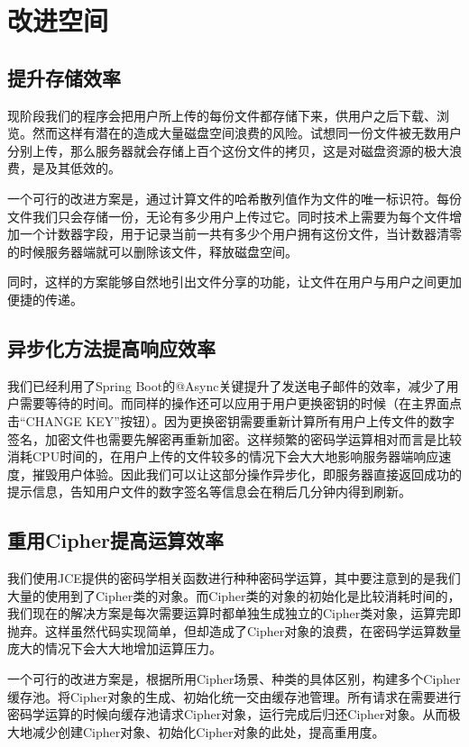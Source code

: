 
\chapter{改进空间}

\section{提升存储效率}

现阶段我们的程序会把用户所上传的每份文件都存储下来，供用户之后下载、浏览。然而这样有潜在的造成大量磁盘空间浪费的风险。试想同一份文件被无数用户分别上传，那么服务器就会存储上百个这份文件的拷贝，这是对磁盘资源的极大浪费，是及其低效的。

一个可行的改进方案是，通过计算文件的哈希散列值作为文件的唯一标识符。每份文件我们只会存储一份，无论有多少用户上传过它。同时技术上需要为每个文件增加一个计数器字段，用于记录当前一共有多少个用户拥有这份文件，当计数器清零的时候服务器端就可以删除该文件，释放磁盘空间。

同时，这样的方案能够自然地引出文件分享的功能，让文件在用户与用户之间更加便捷的传递。

\section{异步化方法提高响应效率}

我们已经利用了Spring Boot的@Async关键提升了发送电子邮件的效率，减少了用户需要等待的时间。而同样的操作还可以应用于用户更换密钥的时候（在主界面点击“CHANGE KEY”按钮）。因为更换密钥需要重新计算所有用户上传文件的数字签名，加密文件也需要先解密再重新加密。这样频繁的密码学运算相对而言是比较消耗CPU时间的，在用户上传的文件较多的情况下会大大地影响服务器端响应速度，摧毁用户体验。因此我们可以让这部分操作异步化，即服务器直接返回成功的提示信息，告知用户文件的数字签名等信息会在稍后几分钟内得到刷新。

\section{重用Cipher提高运算效率}

我们使用JCE提供的密码学相关函数进行种种密码学运算，其中要注意到的是我们大量的使用到了Cipher类的对象。而Cipher类的对象的初始化是比较消耗时间的，我们现在的解决方案是每次需要运算时都单独生成独立的Cipher类对象，运算完即抛弃。这样虽然代码实现简单，但却造成了Cipher对象的浪费，在密码学运算数量庞大的情况下会大大地增加运算压力。

一个可行的改进方案是，根据所用Cipher场景、种类的具体区别，构建多个Cipher缓存池。将Cipher对象的生成、初始化统一交由缓存池管理。所有请求在需要进行密码学运算的时候向缓存池请求Cipher对象，运行完成后归还Cipher对象。从而极大地减少创建Cipher对象、初始化Cipher对象的此处，提高重用度。

